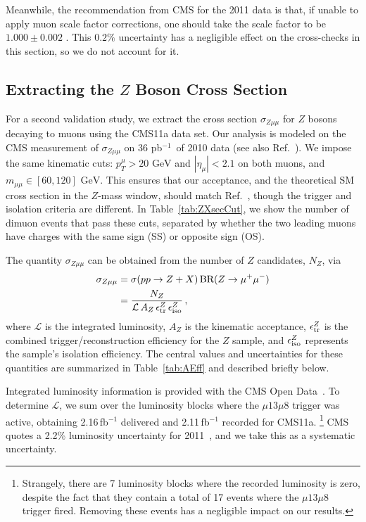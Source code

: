 \documentclass[aps,prd,twocolumn,superscriptaddress,preprintnumbers,nofootinbib,longbibliography,floatfix]{revtex4-1}
\newcommand{\GeV}{\text{~GeV}}
\newcommand{\BR}{\text{BR}}
\newcommand{\cL}{\mathcal{L}}
\newcommand{\inv}{$^{-1}$}
\DeclareRobustCommand{\Tab}[1]{Table~\ref{#1}}
\DeclareRobustCommand{\Ref}[1]{Ref.~\cite{#1}}
\begin{document}
Meanwhile, the recommendation from CMS for the 2011 data is that, if unable to apply muon scale factor corrections, one should take the scale factor to be $1.000 \pm 0.002$  \cite{CERNOpenDataMuonRecommendations}.
%
This $0.2\%$ uncertainty has a negligible effect on the cross-checks in this section, so we do not account for it.


\subsection{Extracting the $Z$ Boson Cross Section}


For a second validation study, we extract the cross section $\sigma_{Z\mu\mu}$ for $Z$ bosons decaying to muons using the CMS11a data set.
%
Our analysis is modeled on the CMS measurement of $\sigma_{Z\mu\mu}$ on 36 pb\inv\ of 2010 data \cite{CMS:2011aa} (see also \Ref{Khachatryan:2010xn}).
%
We impose the same kinematic cuts:  $p^\mu_T> 20 \GeV$ and $|\eta_\mu| < 2.1$ on both muons, and $m_{\mu\mu} \in [60,120] \GeV$.
%
This ensures that our acceptance, and the theoretical SM cross section in the $Z$-mass window, should match \Ref{CMS:2011aa}, though the trigger and isolation criteria are different.
%
In \Tab{tab:ZXsecCut}, we show the number of dimuon events that pass these cuts, separated by whether the two leading muons have charges with the same sign (SS) or opposite sign (OS).



The quantity $\sigma_{Z\mu\mu}$ can be obtained from the number of $Z$ candidates, $N_Z$, via
%
\begin{align}
	\label{eq:ZXsec}
	\sigma_{Z\mu\mu} &= \sigma(pp\to Z+X) \, \BR(Z\to \mu^+\mu^-) \nonumber \\
	&= \frac{N_Z}{\cL \, A_Z \, \epsilon^Z_{\rm tr} \, \epsilon^Z_{\rm iso}  } \, ,
\end{align}
%
where $\cL$ is the integrated luminosity, $A_Z$ is the kinematic acceptance, $\epsilon^Z_{\rm tr}$ is the combined trigger/reconstruction efficiency for the $Z$ sample, and $\epsilon^Z_{\rm iso}$ represents the sample's isolation efficiency.
%
The central values and uncertainties for these quantities are summarized in \Tab{tab:AEff} and described briefly below.

Integrated luminosity information is provided with the CMS Open Data~\cite{CMS:2011Lumi}. 
%
To determine $\cL$, we sum over the luminosity blocks where the $\mu13\mu8$ trigger was active, obtaining 2.16\,fb$^{-1}$ delivered and 2.11\,fb$^{-1}$ recorded for CMS11a.%
%
\footnote{Strangely, there are 7 luminosity blocks where the recorded luminosity is zero, despite the fact that they contain a total of 17 events where the $\mu13\mu8$ trigger fired.  Removing these events has a negligible impact on our results.}
%
CMS quotes a 2.2\% luminosity uncertainty for 2011~\cite{CMS-PAS-SMP-12-008}, and we take this as a systematic uncertainty.
\end{document}
